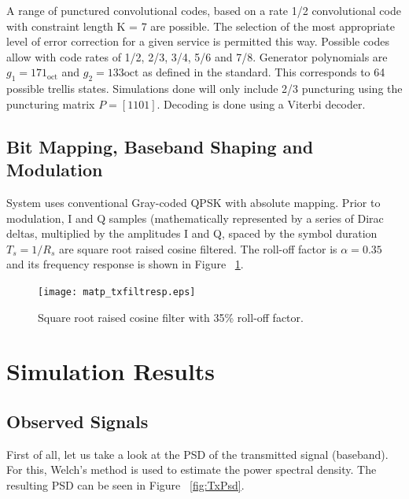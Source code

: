 \documentclass[paper=a4, fontsize=11pt]{scrartcl}	%
\numberwithin{equation}{section}		%
\numberwithin{figure}{section}			%
\numberwithin{table}{section}			%
\begin{document}
A range of punctured convolutional codes, based on a rate 1/2 convolutional code with constraint length K = 7 are possible. The selection of the most appropriate level of error correction for a given service is permitted this way. Possible codes allow with code rates of 1/2, 2/3, 3/4, 5/6 and 7/8. Generator polynomials are $g_1=171_{\text{oct}}$ and $g_2=133{\text{oct}}$ as defined in the standard. This corresponds to 64 possible trellis states. Simulations done will only include 2/3 puncturing using the puncturing matrix $P=[1 1 0 1]$. Decoding is done using a Viterbi decoder.

\subsection{Bit Mapping, Baseband Shaping and Modulation}

System uses conventional Gray-coded QPSK with absolute mapping. Prior to modulation, I and Q samples  (mathematically represented by a series of Dirac deltas, multiplied by the amplitudes I and Q, spaced by the symbol duration $T_s=1/R_s$ are square root raised cosine filtered. The roll-off factor is $\alpha=0.35$ and its frequency response is shown in Figure ~\ref{fig:txFilt}.

\begin{figure}[htb]
\centering
\texttt{[image: matp\_txfiltresp.eps]}
\caption{Square root raised cosine filter with 35\% roll-off factor.}\label{fig:txFilt}
\end{figure}


\section{Simulation Results}

\subsection{Observed Signals}

First of all, let us take a look at the PSD of the transmitted signal (baseband). For this, Welch's method is used to estimate the power spectral density. The resulting PSD can be seen in Figure ~\ref{fig:TxPsd}.
\\
\end{document}
